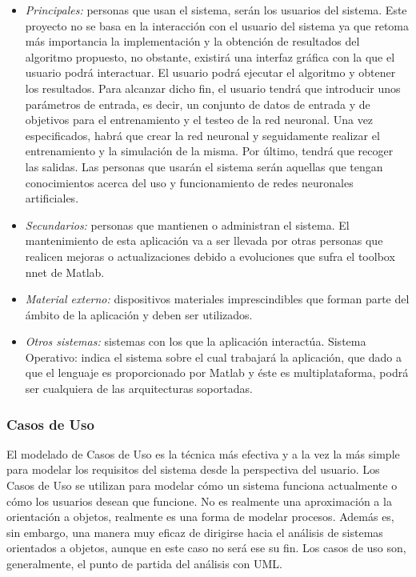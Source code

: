 			\begin{itemize}
				\item \textit{Principales:} personas que usan el sistema, serán los usuarios del sistema. Este proyecto no se basa en la interacción con el usuario del sistema ya que retoma más importancia la implementación y la obtención de resultados del algoritmo propuesto, no obstante, existirá una interfaz gráfica con la que el usuario podrá interactuar. El usuario podrá ejecutar el algoritmo y obtener los resultados. Para alcanzar dicho fin, el usuario tendrá que introducir unos parámetros de entrada, es decir, un conjunto de datos de entrada y de objetivos para el entrenamiento y el testeo de la red neuronal. Una vez especificados, habrá que crear la red neuronal y seguidamente realizar el entrenamiento y la simulación de la misma. Por último, tendrá que recoger las salidas. Las personas que usarán el sistema serán aquellas que tengan conocimientos acerca del uso y funcionamiento de redes neuronales artificiales.
				\item \textit{Secundarios:} personas que mantienen o administran el sistema. El mantenimiento de esta aplicación va a ser llevada por otras personas que realicen mejoras o actualizaciones debido a evoluciones que sufra el toolbox nnet de Matlab.
				\item \textit{Material externo:} dispositivos materiales imprescindibles que forman parte del ámbito de la aplicación y deben ser utilizados.
				\item \textit{Otros sistemas:} sistemas con los que la aplicación interactúa. Sistema Operativo: indica el sistema sobre el cual trabajará la aplicación, que dado a que el lenguaje es proporcionado por Matlab y éste es multiplataforma, podrá ser cualquiera de las arquitecturas soportadas.
			\end{itemize}

			\subsubsection{Casos de Uso}
	
			El modelado de Casos de Uso es la técnica más efectiva y a la vez la más simple para modelar los requisitos del sistema desde la perspectiva del usuario. Los Casos de Uso se utilizan para modelar cómo un sistema funciona actualmente o cómo los usuarios desean que funcione. No es realmente una aproximación a la orientación a objetos, realmente es una forma de modelar procesos. Además es, sin embargo, una manera muy eficaz de dirigirse hacia el análisis de sistemas orientados a objetos, aunque en este caso no será ese su fin. Los casos de uso son, generalmente, el punto de partida del análisis con UML.\\
			
